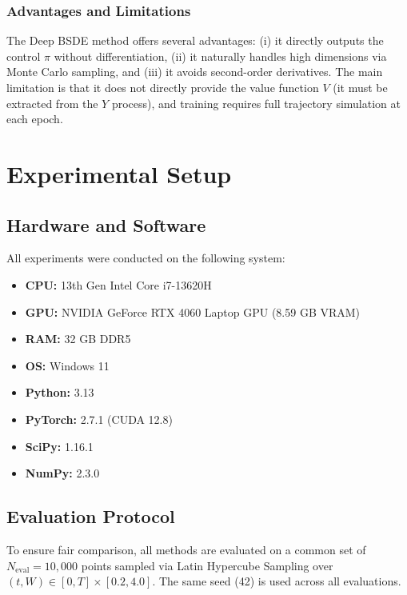 \documentclass[12pt,a4paper]{article}
\begin{document}
\subsubsection{Advantages and Limitations}

The Deep BSDE method offers several advantages: (i) it directly outputs the control $\pi$ without differentiation, (ii) it naturally handles high dimensions via Monte Carlo sampling, and (iii) it avoids second-order derivatives. The main limitation is that it does not directly provide the value function $V$ (it must be extracted from the $Y$ process), and training requires full trajectory simulation at each epoch.

\section{Experimental Setup}
\label{sec:setup}

\subsection{Hardware and Software}

All experiments were conducted on the following system:

\begin{itemize}
    \item \textbf{CPU:} 13th Gen Intel Core i7-13620H
    \item \textbf{GPU:} NVIDIA GeForce RTX 4060 Laptop GPU (8.59 GB VRAM)
    \item \textbf{RAM:} 32 GB DDR5
    \item \textbf{OS:} Windows 11
    \item \textbf{Python:} 3.13
    \item \textbf{PyTorch:} 2.7.1 (CUDA 12.8)
    \item \textbf{SciPy:} 1.16.1
    \item \textbf{NumPy:} 2.3.0
\end{itemize}

\subsection{Evaluation Protocol}

To ensure fair comparison, all methods are evaluated on a common set of $N_{\text{eval}} = 10{,}000$ points sampled via Latin Hypercube Sampling over $(t, W) \in [0, T] \times [0.2, 4.0]$. The same seed (42) is used across all evaluations.
\end{document}
